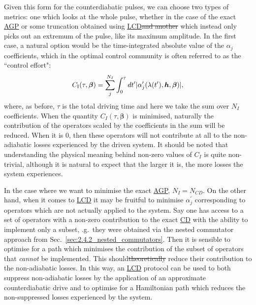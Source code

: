 \documentclass[a4paper,oneside,11pt]{book}
\newcommand{\betabb}{\boldsymbol{\beta}}
\newcommand{\hbb}{\boldsymbol{h}}
\newcommand{\acrref}[1]{\hyperref[acr:#1]{#1}}
\providecommand{\DIFaddtex}[1]{{\protect\color{blue}\uwave{#1}}} %
\providecommand{\DIFdeltex}[1]{{\protect\color{red}\sout{#1}}}                      %
\providecommand{\DIFaddbegin}{} %
\providecommand{\DIFaddend}{} %
\providecommand{\DIFdelbegin}{} %
\providecommand{\DIFdelend}{} %
\providecommand{\DIFadd}[1]{\texorpdfstring{\DIFaddtex{#1}}{#1}} %
\providecommand{\DIFdel}[1]{\texorpdfstring{\DIFdeltex{#1}}{}} %
\newcommand{\DIFscaledelfig}{0.5}
\newlength{\DIFdelgraphicswidth} %
\newlength{\DIFdelgraphicsheight} %
\newcommand{\DIFaddincludegraphics}[2][]{{\color{blue}\fbox{\DIFOincludegraphics[#1]{#2}}}} %
\newcommand{\DIFdelincludegraphics}[2][]{%
\sbox{\DIFdelgraphicsbox}{\DIFOincludegraphics[#1]{#2}}%
\settoboxwidth{\DIFdelgraphicswidth}{\DIFdelgraphicsbox} %
\settoboxtotalheight{\DIFdelgraphicsheight}{\DIFdelgraphicsbox} %
\scalebox{\DIFscaledelfig}{%
\parbox[b]{\DIFdelgraphicswidth}{\usebox{\DIFdelgraphicsbox}\\[-\baselineskip] \rule{\DIFdelgraphicswidth}{0em}}\llap{\resizebox{\DIFdelgraphicswidth}{\DIFdelgraphicsheight}{%
\setlength{\unitlength}{\DIFdelgraphicswidth}%
\begin{picture}(1,1)%
\thicklines\linethickness{2pt} %
{\color[rgb]{1,0,0}\put(0,0){\framebox(1,1){}}}%
{\color[rgb]{1,0,0}\put(0,0){\line( 1,1){1}}}%
{\color[rgb]{1,0,0}\put(0,1){\line(1,-1){1}}}%
\end{picture}%
}\hspace*{3pt}}} %
} %
\DeclareRobustCommand{\DIFaddbegin}{\DIFOaddbegin \let\includegraphics\DIFaddincludegraphics} %
\DeclareRobustCommand{\DIFaddend}{\DIFOaddend \let\includegraphics\DIFOincludegraphics} %
\DeclareRobustCommand{\DIFdelbegin}{\DIFOdelbegin \let\includegraphics\DIFdelincludegraphics} %
\DeclareRobustCommand{\DIFdelend}{\DIFOaddend \let\includegraphics\DIFOincludegraphics} %
\begin{document}
Given this form for the counterdiabatic pulses, we can choose two types of metrics: \DIFaddbegin \DIFadd{(i) }\DIFaddend one which looks at the whole pulse, whether in the case of the exact \acrref{AGP} or some truncation obtained using \acrref{LCD}\DIFdelbegin \DIFdel{and another }\DIFdelend \DIFaddbegin \DIFadd{, and (ii) one }\DIFaddend which instead only picks out an extremum of the pulse, like its maximum amplitude. In the first case, a natural option would be the time-integrated absolute value of the $\alpha_j$ coefficients, which in the optimal control community is often referred to as the ``control effort"\cite{petersen_control_1987}:
\begin{equation}\label{eq:COLD_costfunc_integral}
    C_{\rm I}(\tau, \betabb) = \sum_j^{N_I} \int_{0}^{\tau} dt^{\prime} |\alpha_j^{\prime}(\lambda(t^{\prime}), \hbb, \betabb)|,
\end{equation}
where, as before, $\tau$ is the total driving time and here we take the sum over $N_I$ coefficients. When the quantity $C_I(\tau, \betabb)$ is minimised, naturally the contribution of the operators scaled by the coefficients in the sum will be reduced. When it is $0$, then these operators will not contribute at all to the non-adiabatic losses experienced by the driven system. It should be noted that understanding the physical meaning behind non-zero values of $C_I$ is quite non-trivial, although it is natural to expect that the larger it is, the more losses the system experiences. 

In the case where we want to minimise the exact \acrref{AGP}, $N_I = N_{CD}$. On the other hand, when it comes to \acrref{LCD} it may be fruitful to minimise $\alpha_j^{\prime}$ corresponding to operators which are not actually applied to the system. Say one has access to a set of operators with a non-zero contribution to the exact \acrref{CD} with the ability to implement only a subset, \@e.g.~they were obtained via the nested commutator approach from Sec.~\ref{sec:2.4.2_nested_commutators}. Then it is sensible to optimise for a path which minimises the contribution of the subset of operators that \emph{cannot} be implemented. This should\DIFdelbegin \DIFdel{theoretically }\DIFdelend \DIFaddbegin \DIFadd{, in theory, }\DIFaddend reduce their contribution to the non-adiabatic losses. In this way, an \acrref{LCD} protocol can be used to both suppress non-adiabatic losses by the application of an approximate counterdiabatic drive and to optimise for a Hamiltonian path which reduces the non-suppressed losses experienced by the system.
\end{document}
